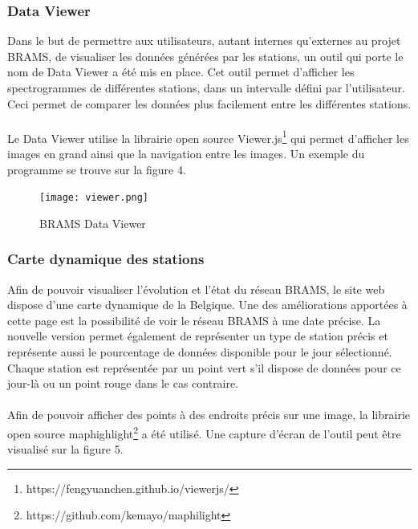 \documentclass[11pt]{article}
\begin{document}
\subsubsection{Data Viewer}
Dans le but de permettre aux utilisateurs, autant internes qu'externes au projet BRAMS, de visualiser les données générées par les stations, un outil qui porte le nom de Data Viewer a été mis en place.
Cet outil permet d'afficher les spectrogrammes de différentes stations, dans un intervalle défini par l'utilisateur.
Ceci permet de comparer les données plus facilement entre les différentes stations.\\
\\
Le Data Viewer utilise la librairie open source Viewer.js\footnote{https://fengyuanchen.github.io/viewerjs/} qui permet d'afficher les images en grand ainsi que la navigation entre les images.
Un exemple du programme se trouve sur la figure 4.

\begin{figure}[t]
    \begin{center}
        \texttt{[image: viewer.png]}
        \caption{BRAMS Data Viewer}
    \end{center}
\end{figure}

\subsubsection{Carte dynamique des stations}
Afin de pouvoir visualiser l'évolution et l'état du réseau BRAMS, le site web dispose d'une carte dynamique de la Belgique.
Une des améliorations apportées à cette page est la possibilité de voir le réseau BRAMS à une date précise.
La nouvelle version permet également de représenter un type de station précis et représente aussi le pourcentage de données disponible pour le jour sélectionné.
Chaque station est représentée par un point vert s'il dispose de données pour ce jour-là ou un point rouge dans le cas contraire.\\
\\
Afin de pouvoir afficher des points à des endroits précis sur une image, la librairie open source maphighlight\footnote{https://github.com/kemayo/maphilight} a été utilisé.
Une capture d'écran de l'outil peut être visualisé sur la figure 5.
\end{document}
